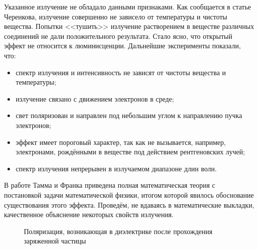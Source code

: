 \documentclass[12pt,a4paper]{report} %
\begin{document}
Указанное излучение не обладало данными признаками. Как сообщается в статье Черенкова, излучение совершенно не зависело от температуры и чистоты вещества. Попытки <<тушить>> излучение растворением в веществе различных соединений не дали положительного результата. Стало ясно, что открытый эффект не относится к люминисценции. Дальнейшие эксперименты показали, что:
\begin{itemize}
    \item спектр излучения и интенсивность не зависят от чистоты вещества и температуры;
    \item излучение связано с движением электронов в среде;
    \item свет поляризован и направлен под небольшим углом к направлению пучка электронов;
    \item эффект имеет пороговый характер, так как не вызывается, например, электронами, рождёнными в веществе под действием рентгеновских лучей;
    \item спектр излучения непрерывен в излучаемом диапазоне длин волн.
\end{itemize}

В работе Тамма и Франка приведена полная математическая теория с постановкой задачи математической физики, итогом которой явилось обоснование существования этого эффекта. Проведём, не вдаваясь в математические выкладки, качественное объяснение некоторых свойств излучения. 

\begin{figure}[th]
	\noindent{}
	\caption{Поляризация, возникающая в диэлектрике после прохождения заряженной частицы}
	\label{pic:Polarisation}
\end{figure}
\end{document}
